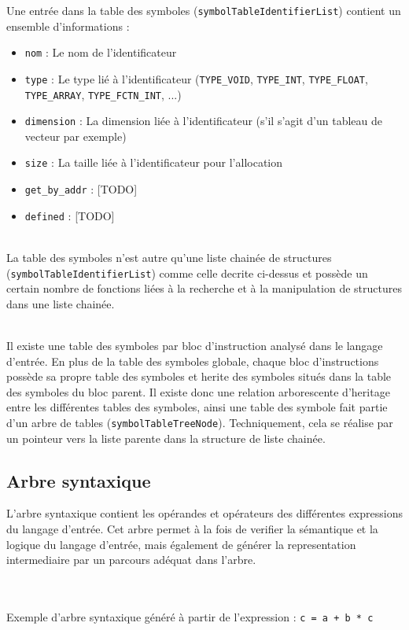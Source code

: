 Une entrée dans la table des symboles (\verb?symbolTableIdentifierList?) contient un ensemble d'informations :

\begin{itemize}
\item \verb?nom? : Le nom de l'identificateur
\item \verb?type? : Le type lié à l'identificateur (\verb?TYPE_VOID?, \verb?TYPE_INT?, \verb?TYPE_FLOAT?, \verb?TYPE_ARRAY?, \verb?TYPE_FCTN_INT?, ...)
\item \verb?dimension? : La dimension liée à l'identificateur (s'il s'agit d'un tableau de vecteur par exemple)
\item \verb?size? : La taille liée à l'identificateur pour l'allocation
\item \verb?get_by_addr? : [TODO]
\item \verb?defined? : [TODO]
\end{itemize}

~~\\
La table des symboles n'est autre qu'une liste chainée de structures\\ (\verb?symbolTableIdentifierList?) comme celle decrite ci-dessus et possède un certain nombre de fonctions liées à la recherche et à la manipulation de structures dans une liste chainée.

~~\\
Il existe une table des symboles par bloc d'instruction analysé dans le langage d'entrée. En plus de la table des symboles globale, chaque bloc d'instructions possède sa propre table des symboles et herite des symboles situés dans la table des symboles du bloc parent. Il existe donc une relation arborescente d'heritage entre les différentes tables des symboles, ainsi une table des symbole fait partie d'un arbre de tables (\verb?symbolTableTreeNode?). Techniquement, cela se réalise par un pointeur vers la liste parente dans la structure de liste chainée.

\subsection{Arbre syntaxique}

L'arbre syntaxique contient les opérandes et opérateurs des différentes expressions du langage d'entrée. Cet arbre permet à la fois de verifier la sémantique et la logique du langage d'entrée, mais également de générer la representation intermediaire par un parcours adéquat dans l'arbre.

~~\\
~~\\
Exemple d'arbre syntaxique généré à partir de l'expression : \verb?c = a + b * c?
\begin{center}
\end{center}

